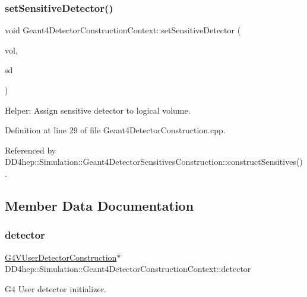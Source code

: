 \subsubsection{\texorpdfstring{set\+Sensitive\+Detector()}{setSensitiveDetector()}}
{\footnotesize\ttfamily void Geant4\+Detector\+Construction\+Context\+::set\+Sensitive\+Detector (\begin{DoxyParamCaption}\item[{G4\+Logical\+Volume $\ast$}]{vol,  }\item[{\hyperlink{class_g4_v_sensitive_detector}{G4\+V\+Sensitive\+Detector} $\ast$}]{sd }\end{DoxyParamCaption})}



Helper\+: Assign sensitive detector to logical volume. 



Definition at line 29 of file Geant4\+Detector\+Construction.\+cpp.



Referenced by D\+D4hep\+::\+Simulation\+::\+Geant4\+Detector\+Sensitives\+Construction\+::construct\+Sensitives().



\subsection{Member Data Documentation}
\hypertarget{class_d_d4hep_1_1_simulation_1_1_geant4_detector_construction_context_a0fc040cea931da95d99ec7d3aca2199d}{}\label{class_d_d4hep_1_1_simulation_1_1_geant4_detector_construction_context_a0fc040cea931da95d99ec7d3aca2199d} 
\subsubsection{\texorpdfstring{detector}{detector}}
{\footnotesize\ttfamily \hyperlink{class_g4_v_user_detector_construction}{G4\+V\+User\+Detector\+Construction}$\ast$ D\+D4hep\+::\+Simulation\+::\+Geant4\+Detector\+Construction\+Context\+::detector}



G4 User detector initializer. 



